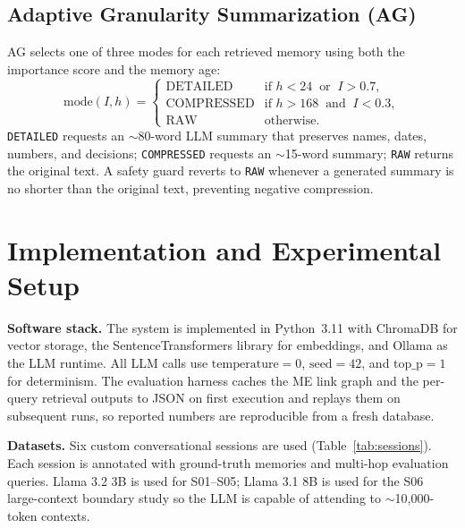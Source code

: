 \documentclass[conference]{IEEEtran}
\begin{document}
\subsection{Adaptive Granularity Summarization (AG)}
AG selects one of three modes for each retrieved memory using both the importance score and the memory age:
\begin{equation}
\label{eq:ag}
\mathrm{mode}(I,h) =
\begin{cases}
\mathrm{DETAILED}    & \text{if } h<24 \;\;\text{or}\;\; I>0.7,\\
\mathrm{COMPRESSED}  & \text{if } h>168 \;\;\text{and}\;\; I<0.3,\\
\mathrm{RAW}         & \text{otherwise.}
\end{cases}
\end{equation}
\texttt{DETAILED} requests an $\sim$80-word LLM summary that preserves names, dates, numbers, and decisions; \texttt{COMPRESSED} requests an $\sim$15-word summary; \texttt{RAW} returns the original text. A safety guard reverts to \texttt{RAW} whenever a generated summary is no shorter than the original text, preventing negative compression.

\section{Implementation and Experimental Setup}
\label{sec:impl}

\textbf{Software stack.} The system is implemented in Python~3.11 with ChromaDB for vector storage, the SentenceTransformers library for embeddings, and Ollama as the LLM runtime. All LLM calls use $\mathrm{temperature}=0$, $\mathrm{seed}=42$, and $\mathrm{top\_p}=1$ for determinism. The evaluation harness caches the ME link graph and the per-query retrieval outputs to JSON on first execution and replays them on subsequent runs, so reported numbers are reproducible from a fresh database.

\textbf{Datasets.} Six custom conversational sessions are used (Table~\ref{tab:sessions}). Each session is annotated with ground-truth memories and multi-hop evaluation queries. Llama 3.2 3B is used for S01--S05; Llama 3.1 8B is used for the S06 large-context boundary study so the LLM is capable of attending to $\sim$10{,}000-token contexts.
\end{document}
